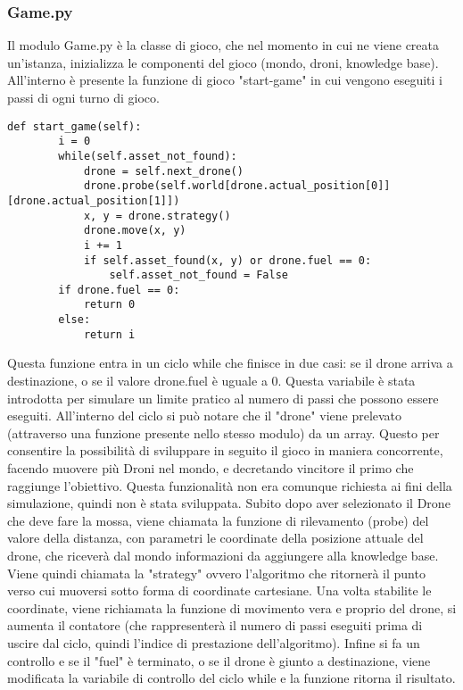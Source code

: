 \subsubsection{Game.py}
Il modulo Game.py è la classe di gioco, che nel momento in cui ne viene creata un'istanza, inizializza le componenti del gioco (mondo, droni, knowledge base). All'interno è presente la funzione di gioco "start-game" in cui vengono eseguiti i passi di ogni turno di gioco. 
\begin{verbatim}
def start_game(self):
        i = 0
        while(self.asset_not_found):
            drone = self.next_drone()
            drone.probe(self.world[drone.actual_position[0]][drone.actual_position[1]])
            x, y = drone.strategy()
            drone.move(x, y)
            i += 1
            if self.asset_found(x, y) or drone.fuel == 0:
                self.asset_not_found = False
        if drone.fuel == 0:
            return 0
        else:
            return i
\end{verbatim}
Questa funzione entra in un ciclo while che finisce in due casi: se il drone arriva a destinazione, o se il valore drone.fuel è uguale a 0. Questa variabile è stata introdotta per simulare un limite pratico al numero di passi che possono essere eseguiti. All'interno del ciclo si può notare che il "drone" viene prelevato (attraverso una funzione presente nello stesso modulo) da un array. Questo per consentire la possibilità di sviluppare in seguito il gioco in maniera concorrente, facendo muovere più Droni nel mondo, e decretando vincitore il primo che raggiunge l'obiettivo. Questa funzionalità non era comunque richiesta ai fini della simulazione, quindi non è stata sviluppata. Subito dopo aver selezionato il Drone che deve fare la mossa, viene chiamata la funzione di rilevamento (probe) del valore della distanza, con parametri le coordinate della posizione attuale del drone, che riceverà dal mondo informazioni da aggiungere alla knowledge base. Viene quindi chiamata la "strategy" ovvero l'algoritmo che ritornerà il punto verso cui muoversi sotto forma di coordinate cartesiane. Una volta stabilite le coordinate, viene richiamata la funzione di movimento vera e proprio del drone, si aumenta il contatore (che rappresenterà il numero di passi eseguiti prima di uscire dal ciclo, quindi l'indice di prestazione dell'algoritmo). Infine si fa un controllo e se il "fuel" è terminato, o se il drone è giunto a destinazione, viene modificata la variabile di controllo del ciclo while e la funzione ritorna il risultato.

